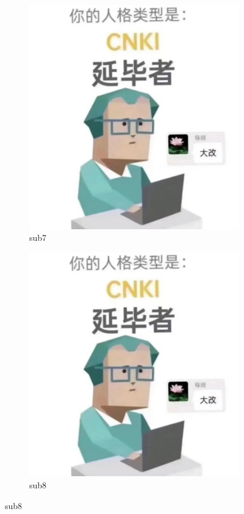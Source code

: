 \begin{figure}[!ht]\ContinuedFloat \centering
	\begin{subfigure}[b]{0.49\textwidth}\centering
		\includegraphics[width=\textwidth]{./Graphs/example/example.jpeg}
		\caption{sub7}\label{subf::sub7}
	\end{subfigure}\hfill %
	\begin{subfigure}[b]{0.49\textwidth}\centering
		\includegraphics[width=\textwidth]{./Graphs/example/example.jpeg}
		\caption{sub8}\label{subf::sub8}
	\end{subfigure}
\end{figure}
